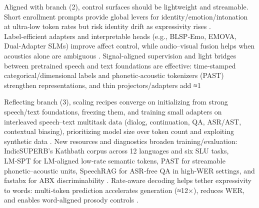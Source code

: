 Aligned with branch (2), control surfaces should be lightweight and streamable. Short enrollment prompts provide global levers for identity/emotion/intonation at ultra‑low token rates but risk identity drift as expressivity rises \cite{wang2024evaluatingtextspeechsynthesislargediscre}. Label‑efficient adapters and interpretable heads (e.g., BLSP‑Emo, EMOVA, Dual‑Adapter SLMs) improve affect control, while audio–visual fusion helps when acoustics alone are ambiguous \cite{wang2024blspemotowardsempatheticlargespeechlangu,chen2025emovaempoweringlanguagemodelsseehearspea,wang2025dualinformationspeechlanguagemodelsemoti}. Signal‑aligned supervision and light bridges between pretrained speech and text foundations are effective: time‑stamped categorical/dimensional labels and phonetic‑acoustic tokenizers (PAST) strengthen representations, and thin projectors/adapters add ≈1%

Reflecting branch (3), scaling recipes converge on initializing from strong speech/text foundations, freezing them, and training small adapters on interleaved speech–text multitask data (dialog, continuation, QA, ASR/AST, contextual biasing), prioritizing model size over token count and exploiting synthetic data \cite{maimon2025scalinganalysisinterleavedspeechtextlang,wang2023slmbridgethingapbetweenspeechtextfoundat}. New resources and diagnostics broaden training/evaluation: IndicSUPERB’s Kathbath corpus across 12 languages and six SLU tasks, LM‑SPT for LM‑aligned low‑rate semantic tokens, PAST for streamable phonetic–acoustic units, SpeechRAG for ASR‑free QA in high‑WER settings, and fastabx for ABX discriminability \cite{entry2025indicsuperbspeechprocessinguniversalperf,jo2025lmsptalignedsemanticdistillationspeechto,har-tuv2025pastphoneticacousticspeechtokenizer,min2025speechretrievalaugmentedgenerationwithou,poli2025fastabxlibraryefficientcomputationabxdis}. Rate‑aware decoding helps tether expressivity to words: multi‑token prediction accelerates generation (≈12×), reduces WER, and enables word‑aligned prosody controls \cite{qian2025prosodylmuncoveringemergingprosodyproces,fan2025whatmakesgoodspeechtokenizerllmcentricge}.

